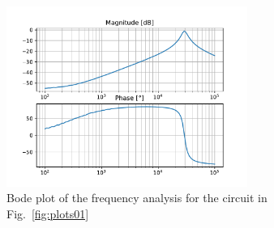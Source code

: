 \documentclass[11pt]{texMemo-gibbons}
\begin{document}
\begin{figure}[h!]
  \centering
  \includegraphics[width=0.7\textwidth]{plots/bode_plots.pdf}
  \caption{Bode plot of the frequency analysis for the circuit in Fig.~\ref{fig:plots01}}
\end{figure}
\end{document}
